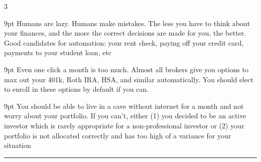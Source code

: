 \documentclass[landscape]{article}
\newcommand{\myline}{\vspace{4pt}\hrule  \vspace{4pt}}
\newenvironment{topic}[1]{
	\noindent \textbf{\textsc{\color{harvardcrimson}{#1}}}
	\noindent \hspace{-3.5pt}
}{
	\myline
}
\newenvironment{prin}[1]{
	\noindent \textit{\color{black}{#1}}
	\begin{adjustwidth}{9pt}{}
		\color{dark-grey}
	}{
	\end{adjustwidth}
}
\begin{document}
\begin{multicols*}{3}
\begin{topic}{Automation Principals}
		\begin{prin}{Principal A\princount: The Principal of Expense Automation: You should automate next to as much of your expenses as you can} Humans are lazy. Humans make mistakes. The less you have to think about your finances, and the more the correct decisions are made for you, the better. Good candidates for automation: your rent check, paying off your credit card, payments to your student loan, etc \end{prin}
		\begin{prin}{Principal A\princount: The Principal of Investing Automation: All of your finances and investing should be automated} Even one click a month is too much. Almost all brokers give you options to max out your 401k, Roth IRA, HSA, and similar automatically. You should elect to enroll in these options by default if you can.  \end{prin}
		\begin{prin}{Principal A\princount: The Principal of Cave Investing: If you can't go long periods without checking your portfolio, its probably not robust} You should be able to live in a cave without internet for a month and not worry about your portfolio. If you can't, either (1) you decided to be an active investor which is rarely appropriate for a non-professional investor or (2) your portfolio is not allocated correctly and has too high of a variance for your situation  \end{prin}
		
	\end{topic}
	
	
	












%
%
%
%









\end{multicols*}
\end{document}
